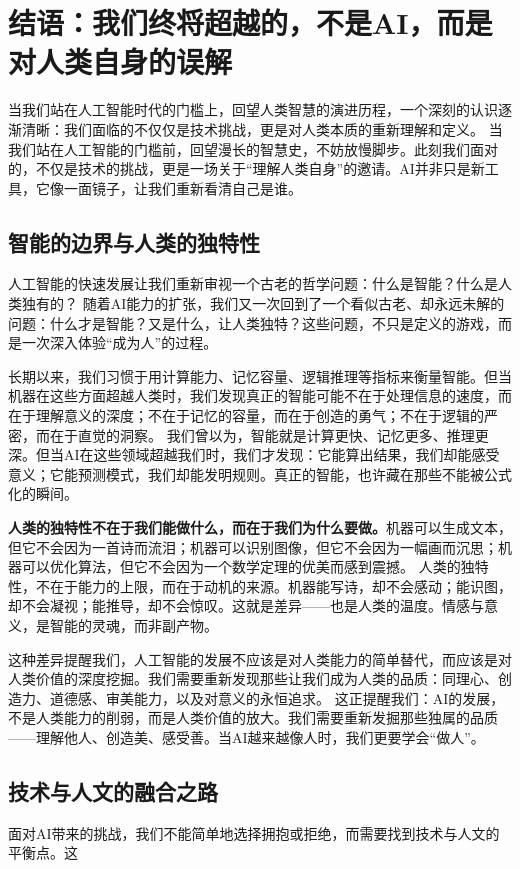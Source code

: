 \section*{结语：我们终将超越的，不是AI，而是对人类自身的误解}

当我们站在人工智能时代的门槛上，回望人类智慧的演进历程，一个深刻的认识逐渐清晰：我们面临的不仅仅是技术挑战，更是对人类本质的重新理解和定义。
当我们站在人工智能的门槛前，回望漫长的智慧史，不妨放慢脚步。此刻我们面对的，不仅是技术的挑战，更是一场关于“理解人类自身”的邀请。AI并非只是新工具，它像一面镜子，让我们重新看清自己是谁。

\subsection*{智能的边界与人类的独特性}

人工智能的快速发展让我们重新审视一个古老的哲学问题：什么是智能？什么是人类独有的？
随着AI能力的扩张，我们又一次回到了一个看似古老、却永远未解的问题：什么才是智能？又是什么，让人类独特？这些问题，不只是定义的游戏，而是一次深入体验“成为人”的过程。

长期以来，我们习惯于用计算能力、记忆容量、逻辑推理等指标来衡量智能。但当机器在这些方面超越人类时，我们发现真正的智能可能不在于处理信息的速度，而在于理解意义的深度；不在于记忆的容量，而在于创造的勇气；不在于逻辑的严密，而在于直觉的洞察。
我们曾以为，智能就是计算更快、记忆更多、推理更深。但当AI在这些领域超越我们时，我们才发现：它能算出结果，我们却能感受意义；它能预测模式，我们却能发明规则。真正的智能，也许藏在那些不能被公式化的瞬间。

{\bf 人类的独特性不在于我们能做什么，而在于我们为什么要做。}机器可以生成文本，但它不会因为一首诗而流泪；机器可以识别图像，但它不会因为一幅画而沉思；机器可以优化算法，但它不会因为一个数学定理的优美而感到震撼。
人类的独特性，不在于能力的上限，而在于动机的来源。机器能写诗，却不会感动；能识图，却不会凝视；能推导，却不会惊叹。这就是差异——也是人类的温度。情感与意义，是智能的灵魂，而非副产物。

这种差异提醒我们，人工智能的发展不应该是对人类能力的简单替代，而应该是对人类价值的深度挖掘。我们需要重新发现那些让我们成为人类的品质：同理心、创造力、道德感、审美能力，以及对意义的永恒追求。
这正提醒我们：AI的发展，不是人类能力的削弱，而是人类价值的放大。我们需要重新发掘那些独属的品质——理解他人、创造美、感受善。当AI越来越像人时，我们更要学会“做人”。

\subsection*{技术与人文的融合之路}

面对AI带来的挑战，我们不能简单地选择拥抱或拒绝，而需要找到技术与人文的平衡点。这